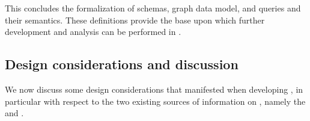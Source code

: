This concludes the formalization of \gql schemas, graph data model, and queries and their semantics.  These definitions provide the base upon which further development and analysis can be performed in \gcoql.


\subsection{Design considerations and discussion}\label{subsec:discussion}

We now discuss some design considerations that manifested when developing 
\gcoql, in particular with respect to the two existing sources of information on \gql, namely the \spec and \HP.


